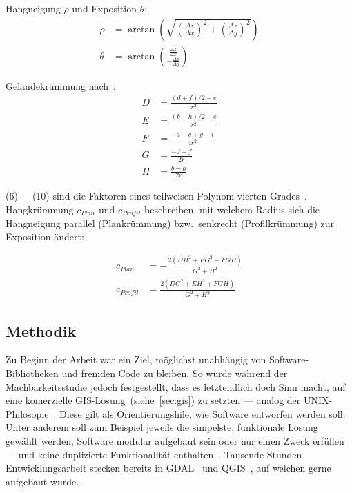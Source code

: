 Hangneigung $\rho$ und Exposition $\theta$:
\begin{align}
  \rho &= \arctan \left( \sqrt{
    {\left( \frac{\Delta z}{\Delta x}\right)}^2 + 
    {\left(\frac{\Delta z}{\Delta y}\right)}^2}
  \right)\\
  \theta &= \arctan\left(\frac{\frac{\Delta z}{\Delta x}}{-\frac{\Delta z}{\Delta y}}\right)
\end{align}

Geländekrümmung nach~\cite{gismath}:
\begin{align}
  D &= \frac{{(d + f) / 2 - e}}{{r^2}} \\
  E &= \frac{{(b + h) / 2 - e}}{{r^2}} \\
  F &= \frac{{-a + c + g - i}}{{4r^2}} \\
  G &= \frac{{-d + f}}{{2r}} \\
  H &= \frac{{b - h}}{{2r}}
\end{align}

(6)~--~(10) sind die Faktoren eines teilweisen Polynom vierten Grades~\cite{gismath}.
Hangkrümmung $c_{Plan}$ und $c_{Profil}$ beschreiben, mit welchem Radius sich die Hangneigung parallel (Plankrümmung) bzw.\ senkrecht (Profilkrümmung) zur Exposition ändert:

\begin{align}
    c_{Plan} &= -\frac{{2(DH^2 + EG^2 - FGH)}}{{G^2 + H^2}}
    \\
    c_{Profil} &= \frac{{2(DG^2 + EH^2 + FGH)}}{{G^2 + H^2}}
\end{align}

\vfill

\pagebreak





\subsection{Methodik}

Zu Beginn der Arbeit war ein Ziel, möglichst unabhängig von Software-Bibliotheken und fremden Code zu bleiben. So wurde während der Machbarkeitsstudie jedoch festgestellt, dass es letztendlich doch Sinn macht, auf eine komerzielle GIS-Lösung~(siehe~\ref{sec:gis}) zu setzten --- analog der UNIX-Philosopie~\cite{unixphil}. Diese gilt als Orientierungshile, wie Software entworfen werden soll. Unter anderem soll zum Beispiel jeweils die simpelste, funktionale Lösung gewählt werden, Software modular aufgebaut sein oder nur einen Zweck erfüllen --- und keine duplizierte Funktionalität enthalten~\cite{unixphil}. Tausende Stunden Entwicklungsarbeit stecken bereits in GDAL~\cite{gdalmanual} und QGIS~\cite{qgis}, auf welchen gerne aufgebaut wurde.
